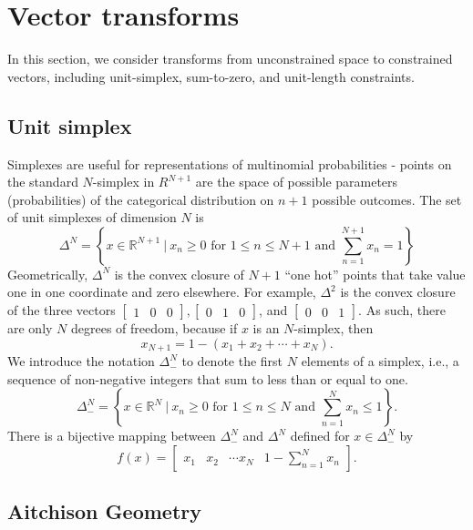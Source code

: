 \documentclass[11pt]{article}
\newcommand{\setcomp}[2]{\left\{ #1 \ \Big|\ #2 \right\}}
\begin{document}
\section{Vector transforms}

In this section, we consider transforms from unconstrained space to constrained vectors, including unit-simplex, sum-to-zero, and unit-length constraints.

\subsection{Unit simplex}

Simplexes are useful for representations of multinomial probabilities - points on the standard $N$-simplex in $R^{N+1}$ are the space of possible parameters (probabilities) of the categorical distribution on $n+1$ possible outcomes. The set of unit simplexes of dimension $N$ is
\[
  \Delta^N = \setcomp{x \in \mathbb{R}^{N + 1}}{x_n \geq 0 \textrm{ for } 1 \leq n \leq N+1 \textrm{ and } \sum_{n=1}^{N + 1} x_n = 1}
\]
Geometrically, $\Delta^N$ is the convex closure of $N+1$ ``one hot'' points that take value one in one coordinate and zero elsewhere.  For example, $\Delta^2$ is the convex closure of the three vectors
$\begin{bmatrix}1 & 0 & 0 \end{bmatrix},
\begin{bmatrix} 0 & 1 & 0 \end{bmatrix}$,
and $\begin{bmatrix} 0 & 0 & 1 \end{bmatrix}$. As such, there are only $N$ degrees of
freedom, because if $x$ is an $N$-simplex, then
\[
  x_{N+1} = 1 - (x_1 + x_2 + \cdots + x_N).
\]
We introduce the notation $\Delta^N_-$ to denote the first $N$ elements of a simplex, i.e., a sequence of non-negative integers that sum to less than or equal to one.
\[
\Delta^N_-
= 
\setcomp{x \in \mathbb{R}^N}{x_n \geq 0 \textrm{ for } 1 \leq n \leq N \textrm{ and } \sum_{n=1}^N x_n \leq 1}.
\]
There is a bijective mapping between $\Delta^N_-$ and $\Delta^N$ defined for $x \in \Delta^N_-$ by 
\[
f(x) = \begin{bmatrix} x_1 & x_2 & \cdots x_N & 1 - \sum_{n=1}^N x_n \end{bmatrix}.
\]

\subsection{Aitchison Geometry}
\end{document}
